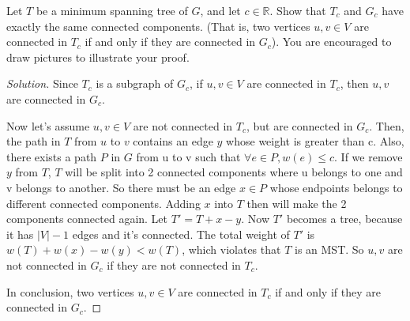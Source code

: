 \usepackage{amsfonts}




    \maketitle

    \begin{thm}{}{}
        Let $T$ be a minimum spanning tree of $G$, and let $c\in \mathbb{R}$.
        Show that $T_c$ and $G_c$ have exactly the same connected components. (That is, two vertices $u,v\in V$ are connected in $T_c$ if and only if they are connected in $G_c$).
        You are encouraged to draw pictures to illustrate your proof.
    \end{thm}
    \begin{proof}[Solution]
        Since $T_c$ is a subgraph of $G_c$, if $u,v\in V$ are connected in $T_c$, then $u,v$ are connected in $G_c$.
        
        Now let's assume $u,v\in V$ are not connected in $T_c$, but are connected in $G_c$.
        Then, the path in $T$ from $u$ to $v$ contains an edge $y$ whose weight is greater than c.
        Also, there exists a path $P$ in $G$ from u to v such that $\forall e\in P, w(e)\leq c$.
        If we remove $y$ from $T$, $T$ will be split into 2 connected components where u belongs to one and v belongs to another.
        So there must be an edge $x\in P$ whose endpoints belongs to different connected components.
        Adding $x$ into $T$ then will make the 2 components connected again.
        Let $T'=T+x-y$.
        Now $T'$ becomes a tree, because it has $|V|-1$ edges and it's connected.
        The total weight of  $T'$ is $w(T)+w(x)-w(y)<w(T)$, which violates that $T$ is an MST\@.
        So $u,v$ are not connected in $G_c$ if they are not connected in $T_c$.

        In conclusion, two vertices $u,v\in V$ are connected in $T_c$ if and only if they are connected in $G_c$.
    \end{proof}




